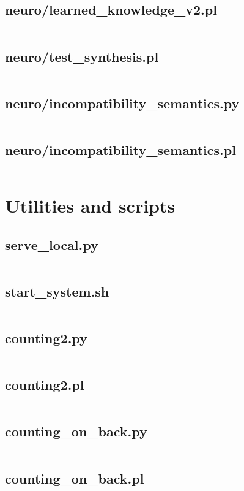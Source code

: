 \documentclass{article}
\begin{document}
\subsection{neuro/learned\_knowledge\_v2.pl}
\inputminted{prolog}{neuro/learned_knowledge_v2.pl}
\subsection{neuro/test\_synthesis.pl}
\inputminted{prolog}{neuro/test_synthesis.pl}
\subsection{neuro/incompatibility\_semantics.py}
\inputminted{python}{neuro/incompatibility_semantics.py}
\subsection{neuro/incompatibility\_semantics.pl}
\inputminted{prolog}{neuro/incompatibility_semantics.pl}

\section{Utilities and scripts}
\subsection{serve\_local.py}
\inputminted{python}{serve_local.py}
\subsection{start\_system.sh}
\inputminted{bash}{start_system.sh}
\subsection{counting2.py}
\inputminted{python}{counting2.py}
\subsection{counting2.pl}
\inputminted{prolog}{counting2.pl}
\subsection{counting\_on\_back.py}
\inputminted{python}{counting_on_back.py}
\subsection{counting\_on\_back.pl}
\inputminted{prolog}{counting_on_back.pl}
\end{document}
